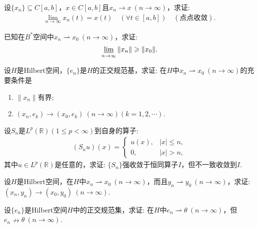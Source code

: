\documentclass[../../main.tex]{subfiles}%
\begin{document}
\begin{example}
设$\{x_n\}\subseteq C[a,b]$，$x\in C[a,b]$且$x_n\to x\ (n\to\infty)$，求证:
\begin{align*}
\lim\limits_{n\to\infty}x_n(t)=x(t)\quad(\forall t\in[a,b])\quad(\text{点点收敛}).
\end{align*}
\end{example}

\begin{example}
已知在$B^*$空间中$x_n\rightharpoonup x_0\ (n\to\infty)$，求证:
\begin{align*}
\varliminf\limits_{n\to\infty}\|x_n\|\geqslant\|x_0\|.
\end{align*}
\end{example}

\begin{example}
设$H$是Hilbert空间，$\{e_n\}$是$H$的正交规范基，求证: 在$H$中$x_n\rightharpoonup x_0\ (n\to\infty)$的充要条件是
\begin{enumerate}[(1)]
\item $\|x_n\|$有界;
\item $(x_n,e_k)\to(x_0,e_k)\ (n\to\infty)(k=1,2,\cdots)$.
\end{enumerate}
\end{example}

\begin{example}
设$S_n$是$L^p(\mathbb{R})(1\leqslant p<\infty)$到自身的算子:
\begin{align*}
(S_nu)(x)=
\begin{cases}
u(x),&|x|\leqslant n,\\
0,&|x|>n,
\end{cases}
\end{align*}
其中$u\in L^p(\mathbb{R})$是任意的，求证: $\{S_n\}$强收敛于恒同算子$I$，但不一致收敛到$I$.
\end{example}

\begin{example}
设$H$是Hilbert空间，在$H$中$x_n\rightharpoonup x_0\ (n\to\infty)$，而且$y_n\rightharpoonup y_0\ (n\to\infty)$，求证: $(x_n,y_n)\to(x_0,y_0)\ (n\to\infty)$.
\end{example}

\begin{example}
设$\{e_n\}$是Hilbert空间$H$中的正交规范集，求证: 在$H$中$e_n\rightharpoonup \theta\ (n\to\infty)$，但$e_n\nrightarrow \theta\ (n\to\infty)$.
\end{example}
\end{document}
